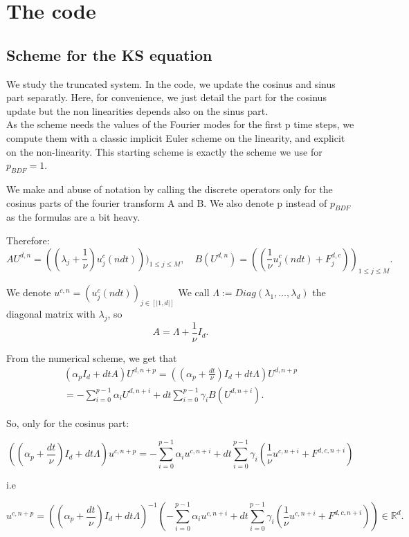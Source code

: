 \documentclass[12pt]{article}
\begin{document}
\section{The code}
\subsection{Scheme for the KS equation}\label{KS_computation_numerics}

We study the truncated system. In the code, we update the cosinus and sinus part separatly. Here, for convenience, we just detail the part for the cosinus update but the non linearities depends also on the sinus part.
\\
As the scheme needs the values of the Fourier modes for the first p time steps, we compute them with a classic implicit Euler scheme on the linearity, and explicit on the non-linearity. This starting scheme is exactly the scheme we use for $p_{BDF}=1.$

We make and abuse of notation by calling the discrete operators only for the cosinus parts of the fourier transform A and B. We also denote p instead of $p_{BDF}$ as the formulas are a bit heavy.

Therefore: 
$$AU^{d,n} = ((\lambda_j + \frac{1}{\nu})u_j^c(ndt)))_{1\leq j \leq M}, \quad B(U^{d,n}) = ((\frac{1}{\nu}u_j^c(ndt) + F_j^{d,c}))_{1\leq j \leq M}.$$


We denote $u^{c,n} =(u_j^c(ndt))_{j\in [|1,d|]}$
We call $\Lambda:= Diag(\lambda_1,\dots,\lambda_d)$ the diagonal matrix with $\lambda_j$,  so $$A = \Lambda + \frac{1}{\nu}I_d.$$
  
From the numerical scheme, we get that 
\begin{align*}
  (\alpha_p I_d + dtA)U^{d,n+p} = ((\alpha_p+\frac{dt}{\nu}) I_d + dt\Lambda)U^{d,n+p}\\
  = -\sum_{i=0}^{p-1}\alpha_iU^{d,n+i} + dt\sum_{i=0}^{p-1}\gamma_i B(U^{d,n+i}).
\end{align*}

So, only for the cosinus part:  
  
$$((\alpha_p+\frac{dt}{\nu}) I_d + dt\Lambda)u^{c,n+p}= -\sum_{i=0}^{p-1}\alpha_iu^{c,n+i} + dt\sum_{i=0}^{p-1}\gamma_i (\frac{1}{\nu} u^{c, n+i} + F^{d, c, n+i})$$

i.e 

$$u^{c, n+p}= ((\alpha_p+\frac{dt}{\nu}) I_d + dt\Lambda)^{-1}(-\sum_{i=0}^{p-1}\alpha_iu^{c, n+i} + dt\sum_{i=0}^{p-1}\gamma_i (\frac{1}{\nu} u^{c, n+i} + F^{d,c, n+i})) \in \mathbb{R}^d.$$
\end{document}

